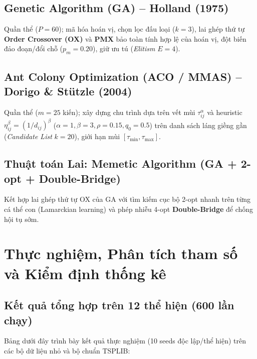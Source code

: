 \documentclass[12pt,a4paper]{report}
\begin{document}
\section{Genetic Algorithm (GA) -- Holland (1975)}
Quần thể ($P=60$); mã hóa hoán vị, chọn lọc đấu loại ($k=3$), lai ghép thứ tự \textbf{Order Crossover (OX)} và \textbf{PMX} bảo toàn tính hợp lệ của hoán vị, đột biến đảo đoạn/đổi chỗ ($p_m=0.20$), giữ ưu tú (\textit{Elitism} $E=4$).

\section{Ant Colony Optimization (ACO / MMAS) -- Dorigo \& Stützle (2004)}
Quần thể ($m=25$ kiến); xây dựng chu trình dựa trên vết mùi $\tau_{ij}^\alpha$ và heuristic $\eta_{ij}^\beta = (1/d_{ij})^\beta$ ($\alpha=1, \beta=3, \rho=0.15, q_0=0.5$) trên danh sách láng giềng gần (\textit{Candidate List} $k=20$), giới hạn mùi $[\tau_{\min}, \tau_{\max}]$.

\section{Thuật toán Lai: Memetic Algorithm (GA + 2-opt + Double-Bridge)}
Kết hợp lai ghép thứ tự OX của GA với tìm kiếm cục bộ 2-opt nhanh trên từng cá thể con (Lamarckian learning) và phép nhiễu 4-opt \textbf{Double-Bridge} để chống hội tụ sớm.

\chapter{Thực nghiệm, Phân tích tham số và Kiểm định thống kê}

\section{Kết quả tổng hợp trên 12 thể hiện (600 lần chạy)}
Bảng dưới đây trình bày kết quả thực nghiệm (10 seeds độc lập/thể hiện) trên các bộ dữ liệu nhỏ và bộ chuẩn TSPLIB:
\end{document}
